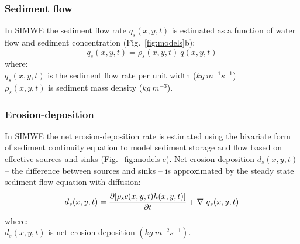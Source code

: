 \documentclass[esurf, manuscript]{copernicus}
\begin{document}

\subsubsection{Sediment flow}

In SIMWE the sediment flow rate $q_s(x,y,t)$ is estimated 
as a function of water flow and sediment concentration
(Fig.~\ref{fig:models}b): %
\begin{equation}\label{eq:sedflow} 
q_s(x,y,t) = \rho_s(x,y,t) ~ q(x,y,t)
\end{equation}
{\small
\noindent
where: \\
\hspace*{0.5em} $q_s(x,y,t)$ is the sediment flow rate per unit width ($kg~m^{-1}s^{-1}$)\\
\hspace*{0.5em} $\rho_s(x,y,t)$ is sediment mass density ($kg~m^{-3}$).\\
}


\subsubsection{Erosion-deposition}

In SIMWE 
the net erosion-deposition rate is estimated
using the bivariate form of sediment continuity equation
to model sediment storage and flow 
based on effective sources and sinks
(Fig.~\ref{fig:models}c). %
Net erosion-deposition $d_s(x,y,t)$
-- the difference between sources and sinks --
is approximated by
the steady state sediment flow equation with diffusion:
\begin{equation}\label{eq:sediment} 
d_s(x,y,t) = 
{\partial [\rho_sc(x,y,t)h(x,y,t)] \over \partial t} +
\nabla ~ q_s(x,y,t)
\end{equation}
{\small
\noindent
where: \\
\hspace*{0.5em} $d_s(x,y,t)$ is net erosion-deposition $(kg ~ m^{-2} s^{-1})$.\\
}
\end{document}
